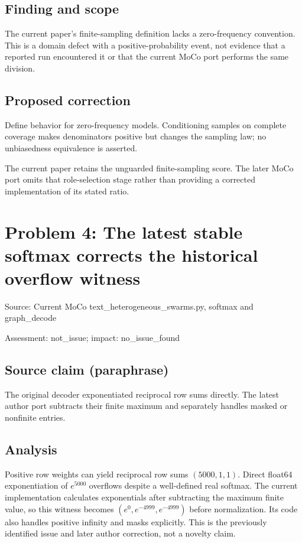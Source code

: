 \documentclass[11pt]{article}
\begin{document}
\subsection*{Finding and scope}

The current paper’s finite-sampling definition lacks a zero-frequency convention. This is a domain defect with a positive-probability event, not evidence that a reported run encountered it or that the current MoCo port performs the same division.

\subsection*{Proposed correction}

Define behavior for zero-frequency models. Conditioning samples on complete coverage makes denominators positive but changes the sampling law; no unbiasedness equivalence is asserted.

The current paper retains the unguarded finite-sampling score. The later MoCo port omits that role-selection stage rather than providing a corrected implementation of its stated ratio.

\section*{Problem 4: The latest stable softmax corrects the historical overflow witness}

Source: Current MoCo text\_heterogeneous\_swarms.py, softmax and graph\_decode

Assessment: not\_issue; impact: no\_issue\_found

\subsection*{Source claim (paraphrase)}

The original decoder exponentiated reciprocal row sums directly. The latest author port subtracts their finite maximum and separately handles masked or nonfinite entries.

\subsection*{Analysis}

Positive row weights can yield reciprocal row sums \((5000,1,1)\). Direct float64 exponentiation of \(e^{5000}\) overflows despite a well-defined real softmax. The current implementation calculates exponentials after subtracting the maximum finite value, so this witness becomes \((e^0,e^{-4999},e^{-4999})\) before normalization. Its code also handles positive infinity and masks explicitly. This is the previously identified issue and later author correction, not a novelty claim.
\end{document}
